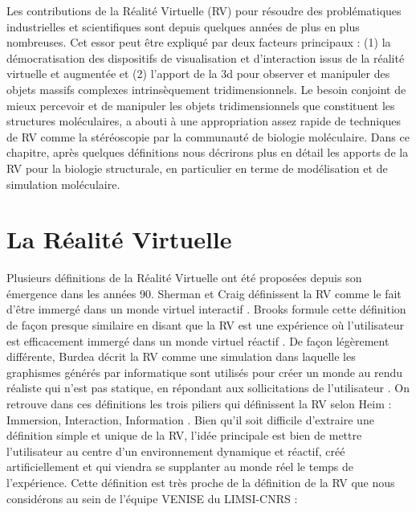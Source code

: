 Les contributions de la Réalité Virtuelle (RV) pour résoudre des problématiques industrielles et scientifiques sont depuis quelques années de plus en plus nombreuses. Cet essor peut être expliqué par deux facteurs principaux : (1) la démocratisation des dispositifs de visualisation et d'interaction issus de la réalité virtuelle et augmentée et (2) l'apport de la 3d pour observer et manipuler des objets massifs complexes intrinsèquement tridimensionnels. Le besoin conjoint de mieux percevoir et de manipuler les objets tridimensionnels que constituent les structures moléculaires, a abouti à une appropriation assez rapide de techniques de RV comme la stéréoscopie par la communauté de biologie moléculaire. Dans ce chapitre, après quelques définitions nous décrirons plus en détail les apports de la RV pour la biologie structurale, en particulier en terme de modélisation et de simulation moléculaire.

\section{La Réalité Virtuelle} \label{RV_science}


Plusieurs définitions de la Réalité Virtuelle ont été proposées depuis son émergence dans les années 90. Sherman et Craig définissent la RV comme le fait d'être immergé dans un monde virtuel interactif \cite{sherman2002understanding}. Brooks formule cette définition de façon presque similaire en disant que la RV est une expérience où l'utilisateur est efficacement immergé dans un monde virtuel réactif \cite{brooks1999s}. De façon légèrement différente, Burdea décrit la RV comme une simulation dans laquelle les graphismes générés par informatique sont utilisés pour créer un monde au rendu réaliste qui n'est pas statique, en répondant aux sollicitations de l'utilisateur \cite{burdea2003virtual}. On retrouve dans ces définitions les trois piliers qui définissent la RV selon Heim : Immersion, Interaction, Information \cite{heim1998virtual}. Bien qu'il soit difficile d'extraire une définition simple et unique de la RV, l'idée principale est bien de mettre l'utilisateur au centre d'un environnement dynamique et réactif, créé artificiellement et qui viendra se supplanter au monde réel le temps de l'expérience. Cette définition est très proche de la définition de la RV que nous considérons au sein de l'équipe VENISE du LIMSI-CNRS \cite{bourdot_patrick_reconstruction_2002}:

